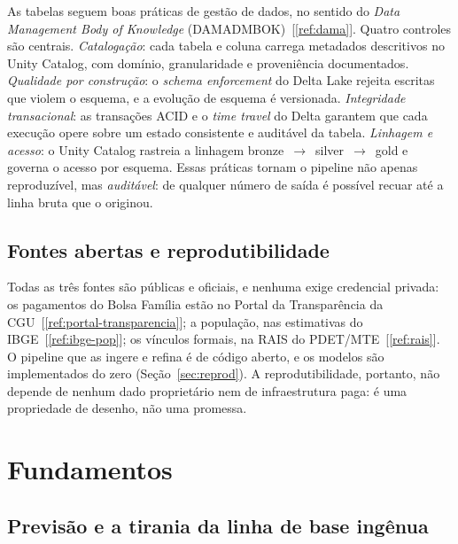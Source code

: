 \documentclass[12pt,a4paper,oneside]{article}
\newcommand{\C}[1]{[\ref{#1}]}
\begin{document}
As tabelas seguem boas práticas de gestão de dados, no sentido do
\emph{Data Management Body of Knowledge} (DAMA\-DMBOK)~\C{ref:dama}. Quatro
controles são centrais. \emph{Catalogação}: cada tabela e coluna carrega
metadados descritivos no Unity Catalog, com domínio, granularidade e
proveniência documentados. \emph{Qualidade por construção}: o
\emph{schema enforcement} do Delta Lake rejeita escritas que violem o
esquema, e a evolução de esquema é versionada. \emph{Integridade
transacional}: as transações ACID e o \emph{time travel} do Delta garantem
que cada execução opere sobre um estado consistente e auditável da tabela.
\emph{Linhagem e acesso}: o Unity Catalog rastreia a linhagem
bronze~$\to$~silver~$\to$~gold e governa o acesso por esquema. Essas
práticas tornam o pipeline não apenas reproduzível, mas \emph{auditável}:
de qualquer número de saída é possível recuar até a linha bruta que o
originou.

\subsection{Fontes abertas e reprodutibilidade}

Todas as três fontes são públicas e oficiais, e nenhuma exige credencial
privada: os pagamentos do Bolsa Família estão no Portal da Transparência
da CGU~\C{ref:portal-transparencia}; a população, nas estimativas do
IBGE~\C{ref:ibge-pop}; os vínculos formais, na RAIS do
PDET/MTE~\C{ref:rais}. O pipeline que as ingere e refina é de código
aberto, e os modelos são implementados do zero
(Seção~\ref{sec:reprod}). A reprodutibilidade, portanto, não depende de
nenhum dado proprietário nem de infraestrutura paga: é uma propriedade de
desenho, não uma promessa.

\section{Fundamentos}
\label{sec:fundamentos}

\subsection{Previsão e a tirania da linha de base ingênua}
\end{document}
